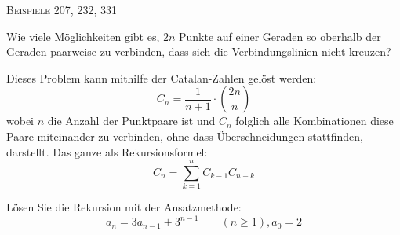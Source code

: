 \documentclass[a4paper, 12pt, margins=3cm]{homework}
\begin{document}
  \begin{center}
    \textsc{Beispiele 207, 232, 331}
  \end{center}


  \begin{problem}
    Wie viele Möglichkeiten gibt es, $2n$ Punkte auf einer Geraden so oberhalb der
    Geraden paarweise zu verbinden, dass sich die Verbindungslinien nicht kreuzen?
  \end{problem}
  \begin{solution}
    Dieses Problem kann mithilfe der Catalan-Zahlen gelöst werden:
    \[ C_n = \frac{1}{n+1}\cdot \binom{2n}{n} \]
    wobei $n$ die Anzahl der Punktpaare ist und $C_n$ folglich alle Kombinationen
    diese Paare miteinander zu verbinden, ohne dass Überschneidungen stattfinden,
    darstellt. Das ganze als Rekursionsformel:
    \[ C_{n} = \sum_{k=1}^{n}{C_{k-1}C_{n-k}} \] 
  \end{solution}


  \begin{problem}
    Lösen Sie die Rekursion mit der Ansatzmethode:
    \[ a_n = 3a_{n-1} + 3^{n-1}\qquad (n\geq 1), a_0 = 2 \]
  \end{problem}
  \begin{solution}
    
  \end{solution}
\end{document}
